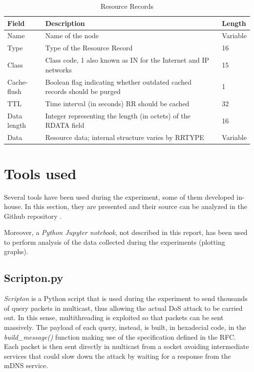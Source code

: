 \documentclass[fleqn, 11pt]{SelfArx} %
\begin{document}
\begin{table}[hbt]
	\centering
	\begin{tabular}{|C{2.0cm}|C{4.2cm}|C{1.25cm}|}
		\hline
		\textbf{Field} & \textbf{Description} & \textbf{Length} \\
		\hline
		\hline
		Name & Name of the node & Variable\\
		\hline
		Type & Type of the Resource Record & 16\\
		\hline
		Class & Class code, 1 also known as IN for the Internet and IP networks & 15\\
		\hline
		Cache-flush & Boolean flag indicating whether outdated cached records should be purged & 1\\
		\hline
		TTL & Time interval (in seconds) RR should be cached & 32\\
		\hline
		Data length & Integer representing the length (in octets) of the RDATA field & 16\\
		\hline
		Data & Resource data; internal structure varies by RRTYPE & Variable\\
		\hline
	\end{tabular}
	\caption{Resource Records}
	\label{table}
\end{table}


\section{Tools used}
Several tools have been used during the experiment, some of them developed in-house. In this section, they are presented and their source can be analyzed in the Github repository \cite{mDNS-security}. 

Moreover, a {\it{Python Jupyter notebook}}, not described in this report, has been used to perform analysis of the data collected during the experiments (plotting graphs).

\subsection{Scripton.py}
\textit{Scripton} is a Python script that is used during the experiment to send thousands of query packets in multicast, thus allowing the actual DoS attack to be carried out.
In this sense, multithreading is exploited so that packets can be sent massively. The payload of each query, instead, is built, in hexadecial code, in the \textit{build\_message()} function making use of the specification defined in the RFC\cite{rfc6762}. Each packet is then sent directly in multicast from a socket avoiding intermediate services that could slow down the attack by waiting for a response from the mDNS service.
\end{document}
